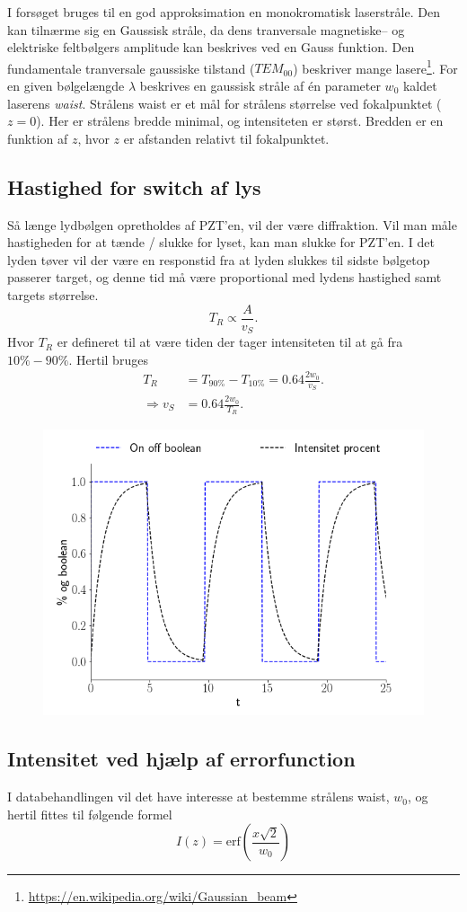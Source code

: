 \documentclass[main]{subfiles}
\begin{document}
I forsøget bruges til en god approksimation en monokromatisk laserstråle. Den kan tilnærme sig en Gaussisk stråle, da dens tranversale magnetiske-- og elektriske feltbølgers amplitude kan beskrives ved en Gauss funktion. Den fundamentale tranversale gaussiske tilstand ($TEM_{00}$) beskriver mange lasere\footnote{\url{https://en.wikipedia.org/wiki/Gaussian_beam}}. For en given bølgelængde $\lambda$ beskrives en gaussisk stråle af én parameter $w_0$ kaldet laserens \emph{waist}. Strålens waist er et mål for strålens størrelse ved fokalpunktet ($z=0$). Her er strålens bredde minimal, og intensiteten er størst. Bredden er en funktion af $z$, hvor $z$ er afstanden relativt til fokalpunktet.

\subsection{Hastighed for switch af lys}
Så længe lydbølgen opretholdes af PZT'en, vil der være diffraktion. Vil man måle hastigheden for at tænde / slukke for lyset, kan man slukke for PZT'en. I det lyden tøver vil der være en responstid fra at lyden slukkes til sidste bølgetop passerer target, og denne tid må være proportional med lydens hastighed samt targets størrelse.
\begin{equation}
    T_R \propto \frac{A}{v_S}.
\end{equation}
Hvor $T_R$ er defineret til at være tiden der tager intensiteten til at gå fra $ 10\% - 90\%$.  Hertil bruges
\begin{align}
    T_R & = T_{90\%} - T_{10\%} = 0.64 \frac{2w_0}{v_S}.\label{eq:risetime} \\
    \Rightarrow v_S & = 0.64 \frac{2w_0}{T_R}.    \label{eq:risetimeIsolere}
\end{align}
\begin{figure}[H]
    \centering
    \includegraphics[width=\linewidth]{tegninger/risefall.png} %
    \caption{}
    \label{}
\end{figure}
\subsection{Intensitet ved hjælp af errorfunction}
I databehandlingen vil det have interesse at bestemme strålens waist, $w_0$, og hertil fittes til følgende formel
\begin{equation}
    I(z) = \text{erf}\left( \frac{x\sqrt{2}}{w_0} \right)
    \label{eq:errorfunc}
\end{equation}
\end{document}
